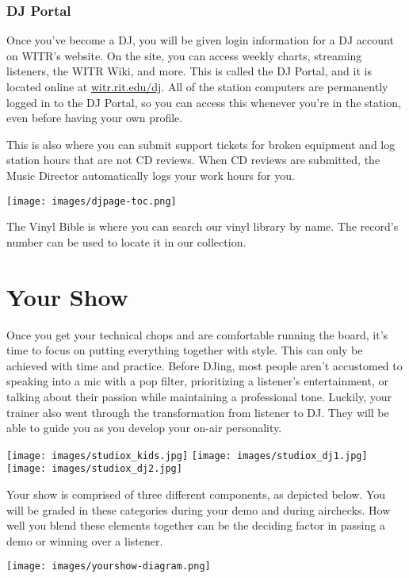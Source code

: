 \documentclass{witrman}
\begin{document}
\subsection{DJ Portal}

Once you've become a DJ, you will be given login information for a DJ account on
WITR's website.  On the site, you can access weekly charts, streaming listeners,
the WITR Wiki, and more.  This is called the DJ Portal, and it is located online
at \href{https://witr.rit.edu/dj/}{witr.rit.edu/dj}.  All of the station
computers are permanently logged in to the DJ Portal, so you can access this
whenever you're in the station, even before having your own profile.

This is also where you can submit support tickets for broken equipment and log
station hours that are not CD reviews.  When CD reviews are submitted, the Music
Director automatically logs your work hours for you.

\texttt{[image: images/djpage-toc.png]}

The Vinyl Bible is where you can search our vinyl library by name.  The record's
number can be used to locate it in our collection.


\chapter{Your Show}

Once you get your technical chops and are comfortable running the board, it's
time to focus on putting everything together with style.  This can only be
achieved with time and practice.  Before DJing, most people aren't accustomed to
speaking into a mic with a pop filter, prioritizing a listener's entertainment,
or talking about their passion while maintaining a professional tone.  Luckily,
your trainer also went through the transformation from listener to DJ\@.  They
will be able to guide you as you develop your on-air personality.

\texttt{[image: images/studiox\_kids.jpg]}
\texttt{[image: images/studiox\_dj1.jpg]}
\texttt{[image: images/studiox\_dj2.jpg]}

Your show is comprised of three different components, as depicted below.  You
will be graded in these categories during your demo and during airchecks.  How
well you blend these elements together can be the deciding factor in passing a
demo or winning over a listener.

\texttt{[image: images/yourshow-diagram.png]}
\end{document}
